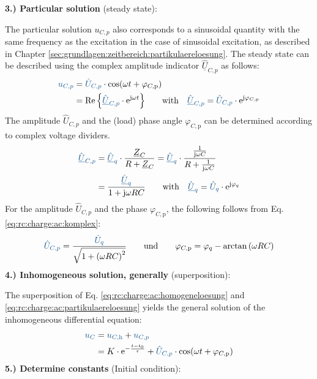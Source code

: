 \begin{frame}[t]
{    \textbf{3.) Particular solution} (steady state):

    The particular solution $u_{C,p}$ also corresponds to a sinusoidal quantity with the same frequency as the excitation in the case of sinusoidal excitation,
    as described in Chapter \ref{sec:grundlagen:zeitbereich:partikulaereloesung}.
    The steady state can be described using the complex amplitude indicator $\hat{\underline{U}}_{C,p}$ as follows:
    \begin{align}
        \ecv{u_{C,p}}
            &= \ecv{\hat{U}_{C,p}} \cdot \cos(\omega t + \varphi_{C,\mathrm{p}})  \label{eq:rc:charge:ac:partikulaereloesung}\\
            &= \Re{\left\{ \ecv{\hat{\underline{U}}_{C,p}} \cdot \mathrm{e}^{\mathrm{j} \omega t} \right\}} \qquad \text{with}\quad \ecv{\hat{\underline{U}}_{C,p}} = \ecv{\hat{U}_{C,p}} \cdot \mathrm{e}^{\mathrm{j} \varphi_{C,\mathrm{p}}}
    \end{align}
    The amplitude $\hat{U}_{C,p}$ and the (load) phase angle $\varphi_{C,\mathrm{p}}$ can be determined according to complex voltage dividers.
    \begin{align}
        \ecv{\hat{\underline{U}}_{C,p}}
            &= \ecv{\hat{\underline{U}}_q} \cdot \frac{\underline{Z}_C}{R + \underline{Z}_C}
            = \ecv{\hat{\underline{U}}_q} \cdot \frac{\frac{1}{\mathrm{j}\omega C}}{R + \frac{1}{\mathrm{j} \omega C}} \nonumber\\
            &= \frac{\ecv{\hat{\underline{U}}_q}}{1 + \mathrm{j} \omega R C}
            \qquad \text{with}\quad \ecv{\hat{\underline{U}}_q} = \ecv{\hat{U}_q} \cdot \mathrm{e}^{\mathrm{j} \varphi_q}
            \label{eq:rc:charge:ac:komplex}
    \end{align}
    For the amplitude $\hat{U}_{C,p}$ and the phase $\varphi_{C,\mathrm{p}}$, the following follows from Eq. \ref{eq:rc:charge:ac:komplex}:
    \begin{align}
        \ecv{\hat{U}_{C,p}} = \frac{\ecv{\hat{U}_q}}{\sqrt{1 + \left(\omega RC\right)^2}} \qquad\text{und}\qquad
        \varphi_{C,\mathrm{p}} = \varphi_q - \arctan\left(\omega RC\right) \label{rc:charge:ac:amplitudephase}
    \end{align}
    \textbf{4.) Inhomogeneous solution, generally} (superposition):

    The superposition of Eq. \ref{eq:rc:charge:ac:homogeneloesung} and \ref{eq:rc:charge:ac:partikulaereloesung}
    yields the general solution of the inhomogeneous differential equation:    \begin{align}
        \ecv{u_C} &= \ecv{u_{C,\mathrm{h}}} + \ecv{u_{C,p}} \nonumber\\
            &= K \cdot \mathrm{e}^{-\frac{t-t_0}{\tau}} + \ecv{\hat{U}_{C,p}} \cdot \cos(\omega t + \varphi_{C,\mathrm{p}}) \label{eq:rc:charge:ac:allg}
    \end{align}
    \textbf{5.) Determine constants} (Initial condition):

}
\end{frame}
